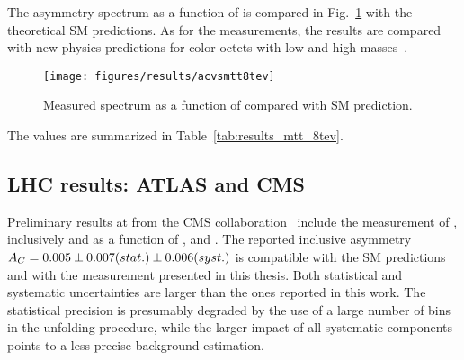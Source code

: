 The asymmetry spectrum as a function of \mtt{} is compared in
Fig.~\ref{fig:8tevacvsmtt} with the theoretical SM predictions.
As for the \seventev{} measurements, the results are compared with new
physics predictions for color octets with low and high
masses~\cite{Aguilar-Saavedra:2014nja}.
\begin{figure}[!htb]\centering
  \texttt{[image: figures/results/acvsmtt8tev]}
  \caption{Measured \ac{} spectrum as a function of \mtt{} compared with SM prediction.}
  \label{fig:8tevacvsmtt}
\end{figure}
The \ac{} values are summarized in Table~\ref{tab:results_mtt_8tev}.


\subsection{LHC results: ATLAS and CMS}

Preliminary results at \eighttev{} from the CMS
collaboration~\cite{CMS-PAS-TOP-12-033} include the measurement of
\ac{}, inclusively and as a function of \mtt{}, \pttt{} and \ytt{}.
The reported inclusive asymmetry
$A_C{}=0.005\pm0.007(stat.)\pm0.006(syst.)$ is compatible with the SM
predictions and with the measurement presented in this thesis. Both
statistical and systematic uncertainties are larger than the ones
reported in this work. The statistical precision is presumably
degraded by the use of a large number of \dy{} bins in the unfolding
procedure, while the larger impact of all systematic components
points to a less precise background estimation.



